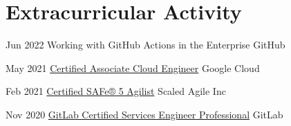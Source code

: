 \documentclass[a4paper]{twentysecondcv} %
\begin{document}
\section{Extracurricular Activity}
%
\begin{twenty} %
    \twentyitem
    {Jun 2022}
    {}
    {Working with GitHub Actions in the Enterprise}
    {GitHub}
    {}
    {}
    
    \twentyitem
    {May 2021}
    {}
    {\href{https://www.credential.net/3e7c1e77-e591-40d3-88ff-67494b422cfc?key=9d07014f6e1465d00a525436cfdb53cc8b7fd70ae353b12ea668dee572d2c797}{Certified Associate Cloud Engineer}}
    {Google Cloud}
    {}
    {}

    \twentyitem
    {Feb 2021}
    {}
    {\href{https://www.youracclaim.com/badges/deb40f91-a445-4e73-aed5-714988eefd80/}{Certified SAFe® 5 Agilist}}
    {Scaled Agile Inc}
    {}
    {}

    \twentyitem
    {Nov 2020}
    {}
    {\href{https://www.credly.com/badges/d9372b90-3057-4429-b61f-e8cd4c2b6615/public_url}{GitLab Certified Services Engineer Professional}}
    {GitLab}
    {}
    {}


\end{twenty}
\end{document}
